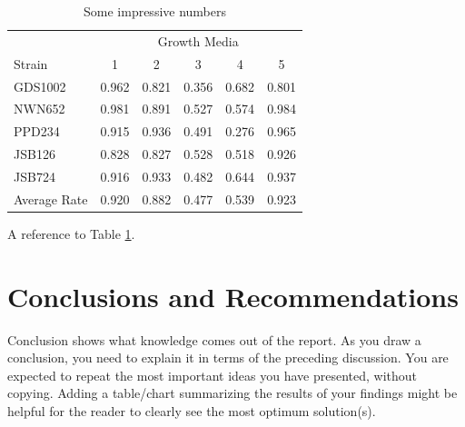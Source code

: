 \documentclass[peerreview]{IEEEtran}
\begin{document}
\begin{table} %
\centering %
\begin{tabular}{l c c c c c} %
\toprule %
& \multicolumn{5}{c}{Growth Media} \\ %
\cmidrule(l){2-6} %
Strain & 1 & 2 & 3 & 4 & 5\\ %
\midrule %
GDS1002 & 0.962 & 0.821 & 0.356 & 0.682 & 0.801\\ %
NWN652 & 0.981 & 0.891 & 0.527 & 0.574 & 0.984\\ %
PPD234 & 0.915 & 0.936 & 0.491 & 0.276 & 0.965\\ %
JSB126 & 0.828 & 0.827 & 0.528 & 0.518 & 0.926\\ %
JSB724 & 0.916 & 0.933 & 0.482 & 0.644 & 0.937\\ %
\midrule %
\midrule %
Average Rate & 0.920 & 0.882 & 0.477 & 0.539 & 0.923\\ %
\bottomrule %
\end{tabular}
\smallskip 
\caption{Some impressive numbers} %
\label{tab:template} %
\end{table}
A reference to Table \ref{tab:template}.

\section{Conclusions and Recommendations}
Conclusion shows what knowledge comes out of the report. As you draw a conclusion, you need to explain it in terms of the preceding discussion. You are expected to repeat the most important ideas you have presented, without copying. Adding a table/chart summarizing the results of your findings might be helpful for the reader to clearly see the most optimum solution(s). 
\end{document}

